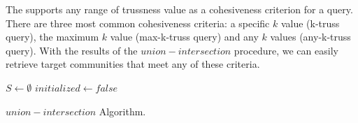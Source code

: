 The \twolevelindex{} supports any range of trussness value as a cohesiveness criterion for a query. There are three most common cohesiveness criteria: a specific $k$ value (k-truss query), the maximum $k$ value (max-k-truss query) and any $k$ values (any-k-truss query). With the results of the $union-intersection$ procedure, we can easily retrieve target communities that meet any of these criteria.

\begin{algorithm}
	\BlankLine
	$S \gets \emptyset$\;
	$initialized \gets false$\;
	\BlankLine
	\caption{$union-intersection$ Algorithm.}\label{alg:union_intersection}
\end{algorithm}


%

